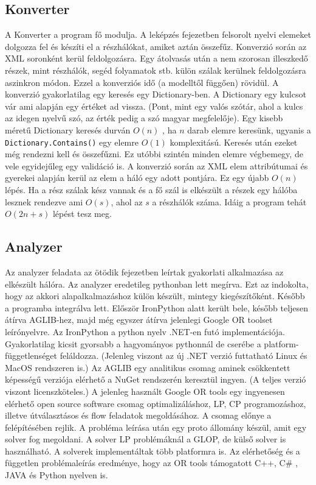 \subsection{Konverter}
A Konverter a program fő modulja. A leképzés fejezetben felsorolt nyelvi elemeket dolgozza fel és készíti el a részhálókat, amiket aztán összefűz. Konverzió során az XML soronként kerül feldolgozásra. Egy átolvasás után a nem szorosan illeszkedő részek, mint részhálók, segéd folyamatok stb. külön szálak kerülnek feldolgozásra aszinkron módon. Ezzel a konverziós idő (a modelltől függően) rövidül. A konverzió gyakorlatilag egy keresés egy Dictionary-ben. A Dictionary egy kulcsot vár ami alapján egy értéket ad vissza. (Pont, mint egy valós szótár, ahol a kulcs az idegen nyelvű szó, az érték pedig a szó magyar megfelelője). Egy kisebb méretű Dictionary keresés durván $O(n)$ , ha $n$ darab elemre keresünk, ugyanis a \texttt{Dictionary.Contains()} egy elemre $O(1)$ komplexitású. Keresés után ezeket még rendezni kell és összefűzni. Ez utóbbi szintén minden elemre végbemegy, de vele egyidejűleg egy validáció is. A konverzió során az XML elem attribútumai és gyerekei alapján kerül az elem a háló egy adott pontjára. Ez egy újabb $O(n)$ lépés. Ha a rész szálak kész vannak és a fő szál is elkészült a részek egy hálóba lesznek rendezve ami $O(s)$, ahol az $s$ a részhálók száma. Idáig a program tehát $O(2n+s)$ lépést tesz meg. 
\subsection{Analyzer}
Az analyzer feladata az ötödik %
 fejezetben leírtak gyakorlati alkalmazása az elkészült hálóra. Az analyzer eredetileg pythonban lett megírva. Ezt az indokolta, hogy az akkori alapalkalmazáshoz külön készült, mintegy kiegészítőként. Később a programba integrálva lett. Először IronPython alatt került bele, később teljesen átírva AGLIB-hez, majd még egyszer átírva jelenlegi Google OR toolset leírónyelvre. Az IronPython a python nyelv .NET-en futó implementációja. Gyakorlatilag kicsit gyorsabb a hagyományos pythonnál de cserébe a platform-függetlenséget feláldozza. (Jelenleg viszont az új .NET verzió futtatható Linux és MacOS rendszeren is.) Az AGLIB egy analitikus csomag aminek csökkentett képességű verziója elérhető a NuGet rendszerén keresztül ingyen. (A teljes verzió viszont licenszköteles.) A jelenleg használt Google OR tools egy ingyenesen elérhető open source software csomag optimalizáláshoz, LP, CP programozáshoz, illetve útválasztásos és flow feladatok megoldásához. A csomag előnye a felépítésében rejlik. A probléma leírása után egy proto állomány  készül, amit egy solver fog megoldani. A solver LP problémáknál a GLOP, de külső solver is használható. A solverek implementáltak több platformra is. Az elérhetőség és a független problémaleírás eredménye, hogy az OR tools támogatott C++, C\# , JAVA és Python nyelven is.
 
